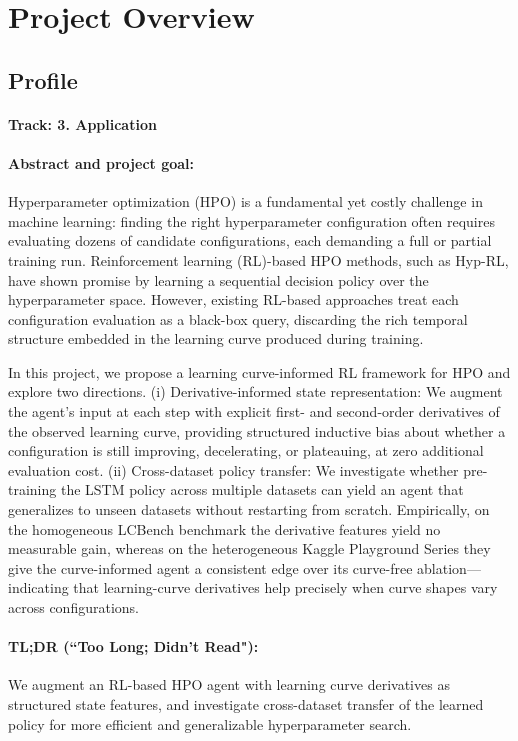 \section{Project Overview}
\label{section:intro}

\subsection{Profile}

\paragraph{Track: 3. Application}

\paragraph{Abstract and project goal:}
Hyperparameter optimization (HPO) is a fundamental yet costly challenge in machine learning: finding the right hyperparameter configuration often requires evaluating dozens of candidate configurations, each demanding a full or partial training run. Reinforcement learning (RL)-based HPO methods, such as Hyp-RL, have shown promise by learning a sequential decision policy over the hyperparameter space. However, existing RL-based approaches treat each configuration evaluation as a black-box query, discarding the rich temporal structure embedded in the learning curve produced during training.

In this project, we propose a learning curve-informed RL framework for HPO and explore two directions. (i) Derivative-informed state representation: We augment the agent's input at each step with explicit first- and second-order derivatives of the observed learning curve, providing structured inductive bias about whether a configuration is still improving, decelerating, or plateauing, at zero additional evaluation cost. (ii) Cross-dataset policy transfer: We investigate whether pre-training the LSTM policy across multiple datasets can yield an agent that generalizes to unseen datasets without restarting from scratch. Empirically, on the homogeneous LCBench benchmark the derivative features yield no measurable gain, whereas on the heterogeneous Kaggle Playground Series they give the curve-informed agent a consistent edge over its curve-free ablation---indicating that learning-curve derivatives help precisely when curve shapes vary across configurations.

\paragraph{TL;DR (``Too Long; Didn't Read"):}
We augment an RL-based HPO agent with learning curve derivatives as structured state features, and investigate cross-dataset transfer of the learned policy for more efficient and generalizable hyperparameter search.

